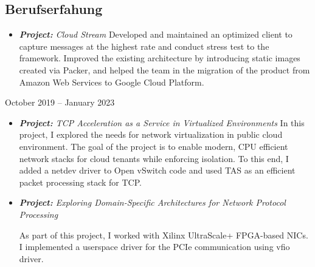 \documentclass[../main.tex]{subfiles}
\begin{document}
  \begin{category}
    \section{Berufserfahung}
      \begin{itemize}
        \item \emph{\textbf{Project:} Cloud Stream}
        Developed and maintained an optimized client
        to capture messages at the highest rate and conduct stress 
        test to the framework. 
        Improved the existing architecture by introducing static images 
        created via Packer, and helped the team 
        in the migration of the product from Amazon Web Services to Google 
        Cloud Platform.
      \end{itemize}

     \strut\hfill October 2019 -- January 2023\\[-9pt]
      \begin{itemize}
        \item \emph{\textbf{Project:} 
          TCP Acceleration as a Service in Virtualized Environments
        }
        In this project, I explored the needs for network 
        virtualization in public cloud environment. The 
        goal of the project is to enable modern, CPU efficient 
        network stacks for cloud tenants while enforcing 
        isolation. To this end, I added a netdev driver to 
        Open vSwitch code and used TAS as an efficient
        packet processing stack for TCP.

        \item \emph{\textbf{Project:} 
          Exploring Domain-Specific Architectures 
          for Network Protocol Processing
        } 

        As part of this project, I worked with 
        Xilinx UltraScale+ FPGA-based NICs. I implemented a 
        userspace driver for the PCIe communication using 
        vfio driver.


\end{itemize}
\end{category}
\end{document}
